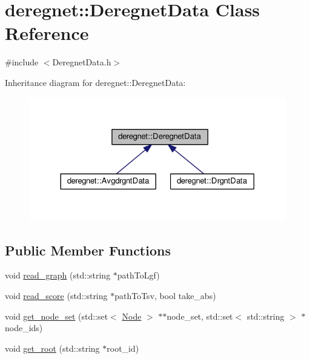 \hypertarget{classderegnet_1_1DeregnetData}{}\section{deregnet\+:\+:Deregnet\+Data Class Reference}
\label{classderegnet_1_1DeregnetData}


{\ttfamily \#include $<$Deregnet\+Data.\+h$>$}



Inheritance diagram for deregnet\+:\+:Deregnet\+Data\+:\nopagebreak
\begin{figure}[H]
\begin{center}
\leavevmode
\includegraphics[width=324pt]{classderegnet_1_1DeregnetData__inherit__graph}
\end{center}
\end{figure}
\subsection*{Public Member Functions}
\begin{DoxyCompactItemize}
\item 
void \hyperlink{classderegnet_1_1DeregnetData_ae5edd8f077b20056f416d42ef3fb03d2}{read\+\_\+graph} (std\+::string $\ast$path\+To\+Lgf)
\item 
void \hyperlink{classderegnet_1_1DeregnetData_a01308048556370738e4ac335aba62ffd}{read\+\_\+score} (std\+::string $\ast$path\+To\+Tsv, bool take\+\_\+abs)
\item 
void \hyperlink{classderegnet_1_1DeregnetData_a7d662c0dd84d814bbaaf56718a99306a}{get\+\_\+node\+\_\+set} (std\+::set$<$ \hyperlink{namespacederegnet_a744bad34f2de9856d36715a445f027f3}{Node} $>$ $\ast$$\ast$node\+\_\+set, std\+::set$<$ std\+::string $>$ $\ast$node\+\_\+ids)
\item 
void \hyperlink{classderegnet_1_1DeregnetData_aaef262d5ca460f10851b25c01ad2f9bc}{get\+\_\+root} (std\+::string $\ast$root\+\_\+id)
\end{DoxyCompactItemize}
